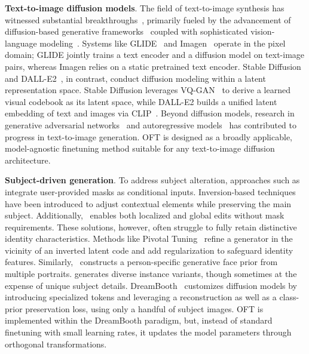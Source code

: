 \textbf{Text-to-image diffusion models}. The field of text-to-image synthesis has witnessed substantial breakthroughs~\cite{saharia2022photorealistic,ramesh2022hierarchical,rombach2022high,gu2022vector,nichol2022glide}, primarily fueled by the advancement of diffusion-based generative frameworks~\cite{ho2020denoising,song2021score,song2021denoising,dhariwal2021diffusion} coupled with sophisticated vision-language modeling~\cite{su2020vlbert,lu2019vilbert,radford2021learning,wang2021simvlm,li2022blip,li2023blip,alayrac2022flamingo,schuhmann2022laion}. Systems like GLIDE~\cite{nichol2022glide} and Imagen~\cite{saharia2022photorealistic} operate in the pixel domain; GLIDE jointly trains a text encoder and a diffusion model on text-image pairs, whereas Imagen relies on a static pretrained text encoder. Stable Diffusion~\cite{rombach2022high} and DALL-E2~\cite{ramesh2022hierarchical}, in contrast, conduct diffusion modeling within a latent representation space. Stable Diffusion leverages VQ-GAN~\cite{esser2021taming} to derive a learned visual codebook as its latent space, while DALL-E2 builds a unified latent embedding of text and images via CLIP~\cite{radford2021learning}. Beyond diffusion models, research in generative adversarial networks~\cite{reed2016generative,zhang2017stackgan,xu2018attngan,li2019controllable} and autoregressive models~\cite{ramesh2021zero,ding2021cogview,wu2022nuwa,yuscaling} has contributed to progress in text-to-image generation. OFT is designed as a broadly applicable, model-agnostic finetuning method suitable for any text-to-image diffusion architecture.

\textbf{Subject-driven generation}. To address subject alteration, approaches such as~\cite{avrahami2022blended,nichol2022glide} integrate user-provided masks as conditional inputs. Inversion-based techniques~\cite{choi2021ilvr,dhariwal2021diffusion,ramesh2022hierarchical,gal2022image} have been introduced to adjust contextual elements while preserving the main subject. Additionally,~\cite{hertz2022prompt} enables both localized and global edits without mask requirements. These solutions, however, often struggle to fully retain distinctive identity characteristics. Methods like Pivotal Tuning~\cite{roich2022pivotal} refine a generator in the vicinity of an inverted latent code and add regularization to safeguard identity features. Similarly,~\cite{nitzan2022mystyle} constructs a person-specific generative face prior from multiple portraits. \cite{casanova2021instance} generates diverse instance variants, though sometimes at the expense of unique subject details. DreamBooth~\cite{ruiz2023dreambooth} customizes diffusion models by introducing specialized tokens and leveraging a reconstruction as well as a class-prior preservation loss, using only a handful of subject images. OFT is implemented within the DreamBooth paradigm, but, instead of standard finetuning with small learning rates, it updates the model parameters through orthogonal transformations.

